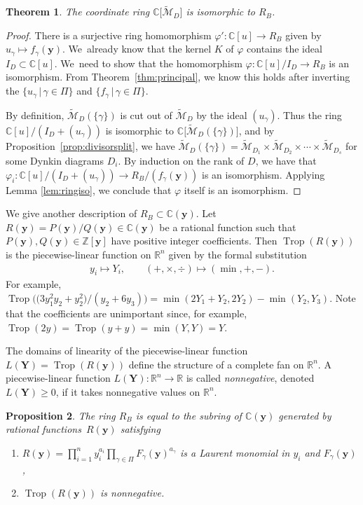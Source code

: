 \documentclass[10pt,a4paper]{amsart}
\def\R{{\mathbb R}}
\def\C{{\mathbb C}}
\def\Z{{\mathbb Z}}
\def\tM{{\widetilde {\mathcal{M}}}}
\def\y{{\mathbf y}}
\def\Trop{\operatorname{Trop}}
\def\Y{{\mathbf Y}}
\numberwithin{equation}{section}
\newtheorem{Theorem}{Theorem}[section]
\newtheorem{Proposition}[Theorem]{Proposition}
\begin{document}
\begin{Theorem}\label{thm:RDisom}
The coordinate ring $\C\big[\tM_D\big]$ is isomorphic to $R_B$. \end{Theorem}
\begin{proof}
There is a surjective ring homomorphism $\varphi'\colon \C[u] \to R_B$ given by $u_\gamma \mapsto f_\gamma(\y)$. We~already know that the kernel $K$ of $\varphi$ contains the ideal $I_D \subset \C[u]$. We~need to show that the homomorphism $\varphi\colon \C[u]/I_D \to R_B$ is an isomorphism. From Theorem~\ref{thm:principal}, we know this holds after inverting the $\{u_\gamma \,|\, \gamma \in \Pi\}$ and $\{f_\gamma \,|\, \gamma \in \Pi\}$.

By definition, $\tM_D(\{\gamma\})$ is cut out of $\tM_D$ by the ideal $(u_\gamma)$. Thus the ring $\C[u]/(I_D+(u_\gamma))$ is isomorphic to $\C\big[\tM_D(\{\gamma\})\big]$, and by Proposition~\ref{prop:divisorsplit}, we have $\tM_D(\{\gamma\}) = \tM_{D_1} \times \tM_{D_2} \times \cdots \allowbreak \times \tM_{D_s}$ for some Dynkin diagrams $D_i$. By induction on the rank of $D$, we have that $\varphi_i\colon \C[u]/\allowbreak(I_D+(u_\gamma)) \to R_B/(f_\gamma(\y))$ is an isomorphism. Applying Lemma \ref{lem:ringiso}, we conclude that $\varphi$ itself is an isomorphism.
\end{proof}

\bigskip{}
We give another description of $R_B \subset \C(\y)$. Let~$R(\y) = P(\y)/Q(\y) \in \C(\y)$ be a rational function such that $P(\y),Q(\y) \in \Z[\y]$ have positive integer coefficients. Then $\Trop(R(\y))$ is the piecewise-linear function on $\R^n$ given by the formal substitution
\begin{gather*}
y_i \mapsto Y_i, \qquad (+, \times, \div) \mapsto (\min, + , -).
\end{gather*}
For example, $\Trop\big(\big(3y_1^2y_2 + y_2^2\big)/(y_2+6y_3)\big) = \min(2Y_1+Y_2,2Y_2)-\min(Y_2,Y_3)$. Note that the coefficients are unimportant since, for example, $\Trop(2y) = \Trop(y+y) = \min(Y,Y) = Y$.

The domains of linearity of the piecewise-linear function $L(\Y) = \Trop(R(\y))$ define the structure of a complete fan on $\R^n$. A piecewise-linear function $L(\Y)\colon \R^n \to \R$ is called \emph{nonnegative}, denoted $L(\Y)\geq 0$, if it takes nonnegative values on $\R^n$.

\begin{Proposition}\label{prop:RD}
The ring $R_B$ is equal to the subring of $\C(\y)$ generated by rational functions~$R(\y)$ satisfying \begin{enumerate}\itemsep=0pt
\item[$(1)$]
$R(\y) = \prod_{i=1}^n y_i^{a_i} \prod_{\gamma \in \Pi} F_\gamma(\y)^{a_\gamma}$ is a Laurent monomial in $y_i$ and $F_\gamma(\y)$,
\item[$(2)$]
$\Trop(R(\y))$ is nonnegative.
\end{enumerate}
\end{Proposition}
\end{document}
